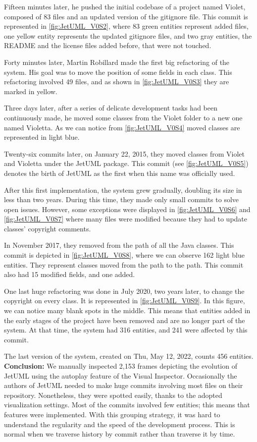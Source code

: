 Fifteen minutes later, he pushed the initial codebase of a project named Violet, composed of 83 files and an updated version of the gitignore file. This commit is represented in \autoref{fig:JetUML_V0S2}, where 83 green entities represent added files, one yellow entity represents the updated gitignore files, and two gray entities, the README and the license files added before, that were not touched.

Forty minutes later, Martin Robillard made the first big refactoring of the system. His goal was to move the position of some fields in each class. This refactoring involved 49 files, and as shown in \autoref{fig:JetUML_V0S3} they are marked in yellow. 

Three days later, after a series of delicate development tasks had been continuously made, he moved some classes from the Violet folder to a new one named Violetta. As we can notice from \autoref{fig:JetUML_V0S4} moved classes are represented in light blue. 

Twenty-six commits later, on January 22, 2015, they moved classes from Violet and Violetta under the JetUML package. 
This commit (see \autoref{fig:JetUML_V0S5}) denotes the birth of JetUML as the first when this name was officially used.

After this first implementation, the system grew gradually, doubling its size in less than two years. 
During this time, they made only small commits to solve open issues. However, some exceptions were displayed in \autoref{fig:JetUML_V0S6} and \autoref{fig:JetUML_V0S7} where many files were modified because they had to update classes' copyright comments. 

In November 2017, they removed  from the path of all the Java classes. This commit is depicted in \autoref{fig:JetUML_V0S8}, where we can observe 162 light blue entities. They represent classes moved from the  path to the 
 path. This commit also had 15 modified fields, and one added. 

One last huge refactoring was done in July 2020, two years later, to change the copyright on every class. It is represented in \autoref{fig:JetUML_V0S9}. In this figure, we can notice many blank spots in the middle. This means that entities added in the early stages of the project have been removed and are no longer part of the system. At that time, the system had 316 entities, and 241 were affected by this commit. 

The last version of the system, created on Thu, May 12, 2022, counts 456 entities. 
\bigbreak
\noindent
\textbf{Conclusion:}
We manually inspected 2,153 frames depicting the evolution of JetUML using the autoplay feature of the Visual Inspector.
Occasionally the authors of JetUML needed to make huge commits involving most files on their repository. Nonetheless, they were spotted easily, thanks to the adopted visualization settings. 
Most of the commits involved few entities; this means that features were implemented. 
With this grouping strategy, it was hard to understand the regularity and the speed of the development process. This is normal when we traverse history by commit rather than traverse it by time. 

